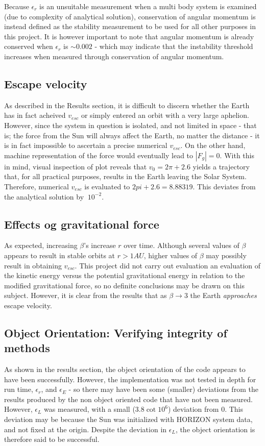 \documentclass[%
oneside,                 %
final,                   %
10pt]{article}
\begin{document}
Because $\epsilon_r$ is an unsuitable measurement when a multi body system is examined (due to complexity of analytical solution), conservation of angular momentum is instead defined as the stability measurement to be used for all other purposes in this project. It is however important to note that angular momentum is already conserved when $\epsilon_r$ is $\sim 0.002$ - which may indicate that the instability threshold increases when measured through conservation of angular momentum. 

\subsection{Escape velocity}
As described in the Results section, it is difficult to discern whether the Earth has in fact  acheived $v_{esc}$ or simply entered an orbit with a very large aphelion. However, since the system in question is isolated, and not limited in space - that is; the force from the Sun will always affect the Earth, no matter the distance - it is in fact impossible to ascertain a precise numerical $v_{esc}$. On the other hand, machine representation of the force would eventually lead to $|F_g|=0$. With this in mind, visual inspection of plot reveals that $ v_0=2\pi+2.6$ yields a trajectory that, for all practical purposes, results in the Earth leaving the Solar System. Therefore, numerical $v_{esc}$ is evaluated to $ 2pi+2.6 = 8.88319$. This deviates from the analytical solution by $~10^{-2}$.

\subsection{Effects og gravitational force}
As expected, increasing $\beta$'s increase $r$ over time. Although several values of $\beta$ appears to result in stable orbits at $r>1 AU$, higher values of $\beta$ may possibly result in obtaining $v_{esc}$. This project did not carry out evaluation an evaluation of the kinetic energy versus the potential gravitational energy in relation to the modified gravitational force, so no definite conclusions may be drawn on this subject. However, it is clear from the results that as $\beta \rightarrow 3$ the Earth \textit{approaches} escape velocity. 

\subsection{Object Orientation: Verifying integrity of methods} 
As shown in the results section, the object orientation of the code appears to have been successfully. However, the implementation was not tested in depth for run time, $\epsilon_r$, and $\epsilon_E$ - so there may have been some (smaller) deviations from the results produced by the non object oriented code that have not been measured. However, $\epsilon_L$ was measured, with a small ($3.8 \cot 10^6$) deviation from $0$. This deviation may be because the Sun was initialized with HORIZON system data, and not fixed at the origin. Despite the deviation in $\epsilon_L$, the object orientation is therefore said to be successful.
\end{document}
